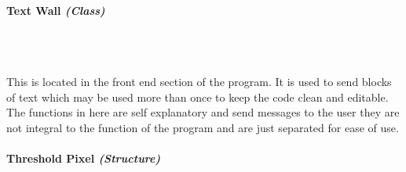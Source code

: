 \begin{FlushLeft}
    \bk


    \pagebreak
\paragraph{Text Wall \textit{(Class)}} \mbox{} \\

    \begin{figure}[H]
        \centering
    \end{figure}\\

    This is located in the front end section of the program. It is used to send blocks of text which may be used more than once to keep the code clean and editable. The functions in here are self explanatory and send messages to the user they are not integral to the function of the program and are just separated for ease of use. \\ 

    \bk

    \pagebreak
\paragraph{Threshold Pixel \textit{(Structure)}} \mbox{} \\

    \begin{figure}[H]
        \centering
    \end{figure}\\


\end{FlushLeft}
